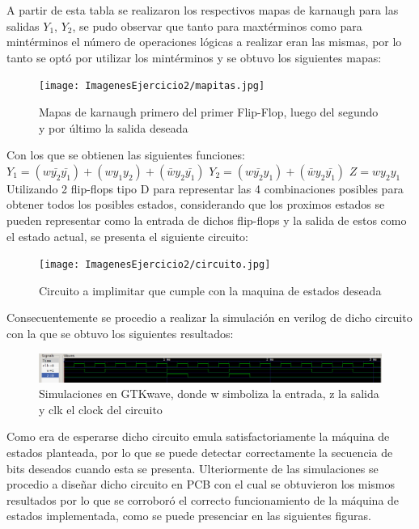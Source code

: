 A partir de esta tabla se realizaron los respectivos mapas de karnaugh para las salidas $Y_1$, $Y_2$, se pudo observar que tanto para maxtérminos como para mintérminos el número de operaciones lógicas a realizar eran las mismas, por lo tanto se optó por utilizar los mintérminos y se obtuvo los siguientes mapas:

\begin{figure}[H]
\centering
\texttt{[image: ImagenesEjercicio2/mapitas.jpg]}
\caption{Mapas de karnaugh primero del primer Flip-Flop, luego del segundo y por último la salida deseada}
\end{figure}
Con los que se obtienen las siguientes funciones:
$Y_1=(w\bar{y_2}\bar{y_1})+(wy_1y_2)+(\bar{w}y_2\bar{y_1})$
$Y_2=(w\bar{y_2}y_1)+(\bar{w}y_2\bar{y_1})$
$Z=wy_2y_1$
Utilizando 2 flip-flops tipo D para representar las 4 combinaciones posibles para obtener todos los posibles estados, considerando que los proximos estados se pueden representar como la entrada de dichos flip-flops y la salida de estos como el estado actual, se presenta el siguiente circuito:
\begin{figure}[H]
\centering
\texttt{[image: ImagenesEjercicio2/circuito.jpg]}
\caption{Circuito a implimitar que cumple con la maquina de estados deseada}
\end{figure}


Consecuentemente se procedio a realizar la simulación en verilog de dicho circuito con la que se obtuvo los siguientes resultados:

\begin{figure}[H]
\centering
\includegraphics{ImagenesEjercicio2/simulacion.png}
\caption{Simulaciones en GTKwave, donde w simboliza la entrada, z la salida y clk el clock del circuito}
\end{figure}


Como era de esperarse dicho circuito emula satisfactoriamente la máquina de estados planteada, por lo que se puede detectar correctamente la secuencia de bits deseados cuando esta se presenta. Ulteriormente de las simulaciones se procedio a diseñar dicho circuito en PCB con el cual se obtuvieron los mismos resultados por lo que se corroboró el correcto funcionamiento de la máquina de estados implementada, como se puede presenciar en las siguientes figuras.

